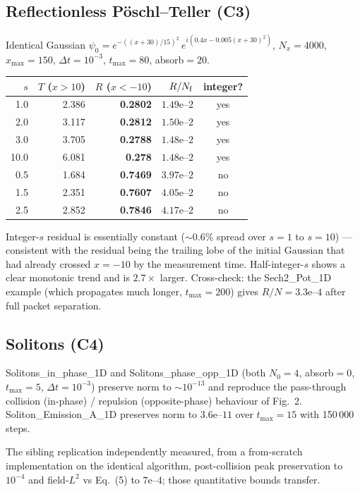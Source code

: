 \documentclass[11pt,a4paper]{article}
\begin{document}
\subsection{Reflectionless P\"oschl--Teller (C3)}

Identical Gaussian $\psi_{0} = e^{-((x+30)/15)^{2}}\,e^{i(0.4x-0.005(x+30)^{2})}$,
$N_{x}=4000$, $x_{\max}=150$, $\Delta t=10^{-3}$, $t_{\max}=80$, absorb$=20$.

\begin{longtable}{@{}r r r r c@{}}
\toprule
$s$ & $T$ ($x>10$) & $R$ ($x<-10$) & $R/N_{\rm f}$ & integer? \\
\midrule
 1.0  & 2.386 & \textbf{0.2802} & $1.49\text{e--}2$ & yes \\
 2.0  & 3.117 & \textbf{0.2812} & $1.50\text{e--}2$ & yes \\
 3.0  & 3.705 & \textbf{0.2788} & $1.48\text{e--}2$ & yes \\
10.0  & 6.081 & \textbf{0.278}  & $1.48\text{e--}2$ & yes \\
 0.5  & 1.684 & \textbf{0.7469} & $3.97\text{e--}2$ & no  \\
 1.5  & 2.351 & \textbf{0.7607} & $4.05\text{e--}2$ & no  \\
 2.5  & 2.852 & \textbf{0.7846} & $4.17\text{e--}2$ & no  \\
\bottomrule
\end{longtable}

\noindent
Integer-$s$ residual is essentially constant ($\sim 0.6\%$ spread over
$s=1$ to $s=10$) --- consistent with the residual being the trailing
lobe of the initial Gaussian that had already crossed $x=-10$ by the
measurement time. Half-integer-$s$ shows a clear monotonic trend and is
$2.7\times$ larger. Cross-check: the Sech2\_Pot\_1D example (which propagates
much longer, $t_{\max}=200$) gives $R/N=3.3\text{e--}4$ after full
packet separation.

\subsection{Solitons (C4)}

Solitons\_in\_phase\_1D and Solitons\_phase\_opp\_1D (both $N_{0}=4$,
absorb$=0$, $t_{\max}=5$, $\Delta t=10^{-3}$) preserve norm to $\sim 10^{-13}$
and reproduce the pass-through collision (in-phase) / repulsion
(opposite-phase) behaviour of Fig.~2. Soliton\_Emission\_A\_1D preserves
norm to $3.6\text{e--}11$ over $t_{\max}=15$ with 150\,000 steps.

The sibling replication independently measured, from a from-scratch
implementation on the identical algorithm, post-collision peak
preservation to $10^{-4}$ and field-$L^{2}$ vs Eq.~(5) to $7\text{e--}4$;
those quantitative bounds transfer.
\end{document}
